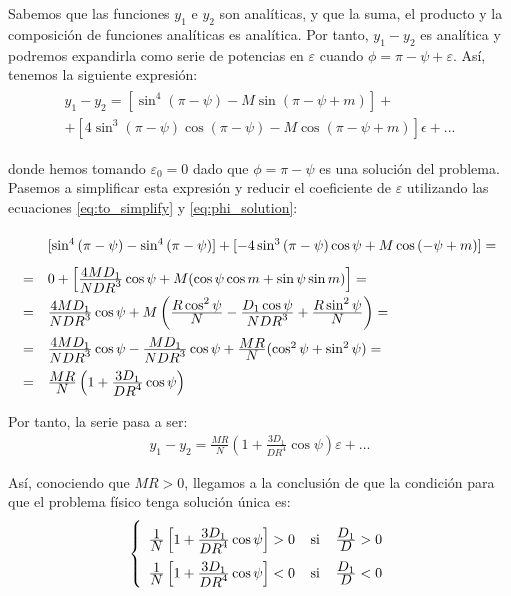\documentclass[11pt]{article}
\newcommand\ddfrac[2]{\frac{\displaystyle #1}{\displaystyle #2}}
\begin{document}
Sabemos que las funciones $y_1$ e $y_2$ son analíticas, y que la suma, el producto y la composición de funciones analíticas es analítica. Por tanto, $y_1-y_2$ es analítica y podremos expandirla como serie de potencias en $\varepsilon$ cuando $\phi=\pi-\psi+\varepsilon$. Así, tenemos la siguiente expresión:
\begin{align}
\begin{array}{l}
y_1-y_2=[\sin^4{(\pi-\psi)}-M\sin{(\pi-\psi+m)}]+\\+[4\sin^3{(\pi-\psi)}\cos{(\pi-\psi)}-M\cos{(\pi-\psi+m)}]\epsilon+...
\end{array}
\label{eq:y1_y2_serie}
\end{align}

\noindent donde hemos tomando $\varepsilon_0=0$ dado que $\phi=\pi-\psi$ es una solución del problema. Pasemos a simplificar esta expresión y reducir el coeficiente de $\varepsilon$ utilizando las ecuaciones \eqref{eq:to_simplify} y \eqref{eq:phi_solution}:
\[
\def\arraystretch{2}
\begin{array}{ll}
& [\sin^4{(\pi-\psi)}-\sin^4{(\pi-\psi)}]+[-4\sin^3{(\pi-\psi)}\cos{\psi}+M\cos{(-\psi+m)}]=\\
= & 0 + \left[\ddfrac{4MD_1}{NDR^3}\cos{\psi}+M(\cos{\psi}\cos{m}+\sin{\psi}\sin{m})\right]=\\
= & \ddfrac{4MD_1}{NDR^3}\cos{\psi}+M\left(\ddfrac{R\cos^2{\psi}}{N}-\ddfrac{D_1\cos{\psi}}{NDR^3}+\ddfrac{R\sin^2{\psi}}{N}\right)=\\
= & \ddfrac{4MD_1}{NDR^3}\cos{\psi}-\ddfrac{MD_1}{NDR^3}\cos{\psi}+\ddfrac{MR}{N}(\cos^2{\psi}+\sin^2{\psi})=\\
= & \ddfrac{MR}{N}\left(1+\ddfrac{3D_1}{DR^4}\cos{\psi}\right)
\end{array}
\]

\vspace{0.4cm}

Por tanto, la serie pasa a ser:
\begin{align}
y_1-y_2=\ddfrac{MR}{N}\left(1+\ddfrac{3D_1}{DR^4}\cos{\psi}\right)\varepsilon+...
\label{eq:y1_y2_serie2}
\end{align}

Así, conociendo que $MR>0$, llegamos a la conclusión de que la condición para que el problema físico tenga solución única es:
\begin{align}
\left\{
\def\arraystretch{2}
\begin{array}{l}
	\ddfrac{1}{N}\left[1+\ddfrac{3D_1}{DR^4}\cos{\psi}\right]>0 \; \; \; \; \text{si} \; \; \; \; \ddfrac{D_1}{D}>0\\
	\ddfrac{1}{N}\left[1+\ddfrac{3D_1}{DR^4}\cos{\psi}\right]<0 \; \; \; \; \text{si} \; \; \; \; \ddfrac{D_1}{D}<0
\end{array}
\right.
\label{eq:condicion_unicidad}
\end{align}
\end{document}
